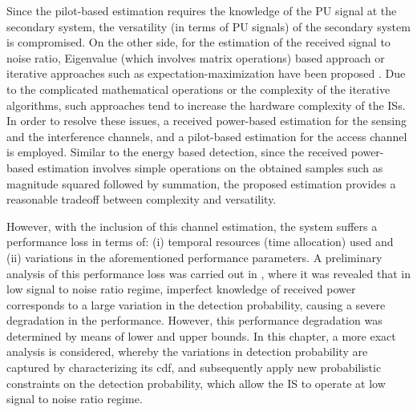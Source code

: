 Since the pilot-based estimation requires the knowledge of the PU signal at the secondary system, the versatility (in terms of PU signals) of the secondary system is compromised. On the other side, for the estimation of the received signal to noise ratio, Eigenvalue (which involves matrix operations) based approach \cite{Sharma13} or iterative approaches such as expectation-maximization have been proposed \cite{Chav11}. Due to the complicated mathematical operations or the complexity of the iterative algorithms, such approaches tend to increase the hardware complexity of the ISs. In order to resolve these issues, a received power-based estimation for the sensing and the interference channels, and a pilot-based estimation for the access channel is employed. Similar to the energy based detection, since the received power-based estimation involves simple operations on the obtained samples such as magnitude squared followed by summation, the proposed estimation provides a reasonable tradeoff between complexity and versatility. %

However, with the inclusion of this channel estimation, the system suffers a performance loss in terms of: (i) temporal resources (time allocation) used and (ii) variations in the aforementioned performance parameters. A preliminary analysis of this performance loss was carried out in \cite{Kaushik15_CC}, where it was revealed that in low signal to noise ratio regime, imperfect knowledge of received power corresponds to a large variation in the detection probability, causing a severe degradation in the performance. However, this performance degradation was determined by means of lower and upper bounds. In this chapter, a more exact analysis is considered, whereby the variations in detection probability are captured by characterizing its cdf, and subsequently apply new probabilistic constraints on the detection probability, which allow the IS to operate at low signal to noise ratio regime. %

